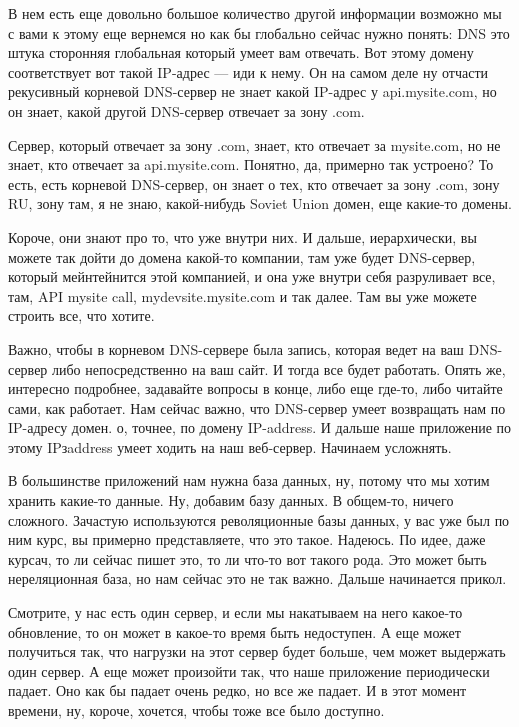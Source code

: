 \documentclass[12pt]{article} %
\begin{document}
В нем есть еще довольно большое количество другой информации возможно мы с вами к этому еще вернемся но как бы глобально сейчас нужно понять: DNS это штука сторонняя глобальная который умеет вам отвечать. Вот этому домену соответствует вот такой IP-адрес --- иди к нему. Он на самом деле ну отчасти рекусивный корневой DNS-сервер не знает какой IP-адрес у api.mysite.com, но он знает, какой другой DNS-сервер отвечает за зону .com.  

Сервер, который отвечает за зону .com, знает, кто отвечает за mysite.com, но не знает, кто отвечает за api.mysite.com.  Понятно, да, примерно так устроено? То есть, есть корневой DNS-сервер, он знает о тех, кто отвечает за зону .com, зону RU, зону там, я не знаю, какой-нибудь Soviet Union домен, еще какие-то домены.  

Короче, они знают про то, что уже внутри них.  И дальше, иерархически, вы можете так дойти до домена какой-то компании, там уже будет DNS-сервер, который мейнтейнится этой компанией, и она уже внутри себя разруливает все, там, API mysite call, mydevsite.mysite.com и так далее.  Там вы уже можете строить все, что хотите.  

Важно, чтобы в корневом DNS-сервере была запись, которая ведет на ваш DNS-сервер либо непосредственно на ваш сайт.  И тогда все будет работать.  Опять же, интересно подробнее, задавайте вопросы в конце, либо еще где-то, либо читайте сами, как работает.  Нам сейчас важно, что DNS-сервер умеет возвращать нам по IP-адресу домен.  о, точнее, по домену IP-address.  И дальше наше приложение по этому IPзaddress умеет ходить на наш веб-сервер.  Начинаем усложнять.  

В большинстве приложений нам нужна база данных, ну, потому что мы хотим хранить какие-то данные.  Ну, добавим базу данных.  В общем-то, ничего сложного.  Зачастую используются револяционные базы данных, у вас уже был по ним курс, вы примерно представляете, что это такое.  Надеюсь.  По идее, даже курсач, то ли сейчас пишет это, то ли что-то вот такого рода.  Это может быть нереляционная база, но нам сейчас это не так важно.  Дальше начинается прикол.  

Смотрите, у нас есть один сервер, и если мы накатываем на него какое-то обновление, то он может в какое-то время быть недоступен.  А еще может получиться так, что нагрузки на этот сервер будет больше, чем может выдержать один сервер.  А еще может произойти так, что наше приложение периодически падает.  Оно как бы падает очень редко, но все же падает.  И в этот момент времени, ну, короче, хочется, чтобы тоже все было доступно.
\end{document}
